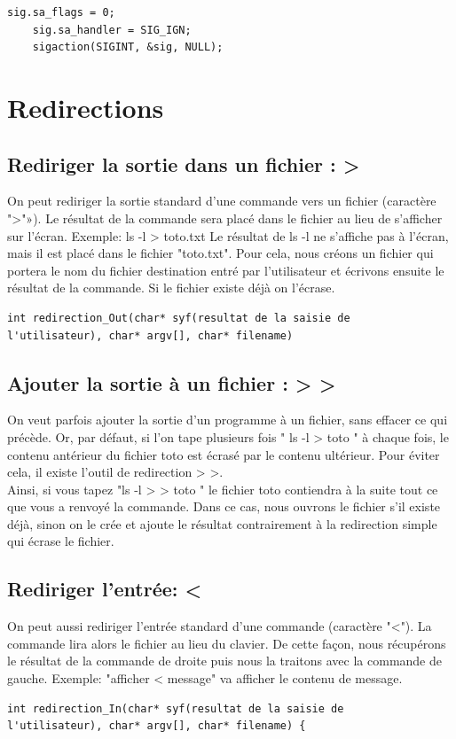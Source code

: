 \begin{lstlisting}[frame=single]
sig.sa_flags = 0;
	sig.sa_handler = SIG_IGN;
	sigaction(SIGINT, &sig, NULL);
\end{lstlisting}

\section{Redirections}
\subsection{Rediriger la sortie dans un fichier : >}
On peut rediriger la sortie standard d'une commande vers un fichier (caractère ">"»). Le résultat de la commande sera placé dans le fichier au lieu de s'afficher sur l'écran. Exemple:  ls -l > toto.txt
Le résultat de ls -l ne s'affiche pas à l'écran, mais il est placé dans le fichier "toto.txt".
Pour cela, nous créons un fichier qui portera le nom du fichier destination entré par l'utilisateur et écrivons ensuite le résultat de la commande. Si le fichier existe déjà on l'écrase.
\\
\begin{lstlisting}[frame=single]
int redirection_Out(char* syf(resultat de la saisie de 
l'utilisateur), char* argv[], char* filename) 
\end{lstlisting}

\subsection{Ajouter la sortie à un fichier : > >} 
On veut parfois ajouter la sortie d'un programme à un fichier, sans effacer ce qui précède. Or, par défaut, si l'on tape plusieurs fois 
" ls -l > toto "
à chaque fois, le contenu antérieur du fichier toto est écrasé par le contenu ultérieur. 
Pour éviter cela, il existe l'outil de redirection > >.
\\Ainsi, si vous tapez "ls -l > > toto "
le fichier toto contiendra à la suite tout ce que vous a renvoyé la commande.
Dans ce cas, nous ouvrons le fichier s'il existe déjà, sinon on le crée et ajoute le résultat contrairement à la redirection simple qui écrase le fichier. 

\subsection{ Rediriger l'entrée: <} 
On peut aussi rediriger l'entrée standard d'une commande (caractère "<"). La commande lira alors le fichier au lieu du clavier. De cette façon, nous récupérons le résultat de la commande de droite puis nous la traitons avec la commande de gauche. Exemple: "afficher < message" va afficher le contenu de message.
\\
\begin{lstlisting}[frame=single]
int redirection_In(char* syf(resultat de la saisie de 
l'utilisateur), char* argv[], char* filename) {
\end{lstlisting}

